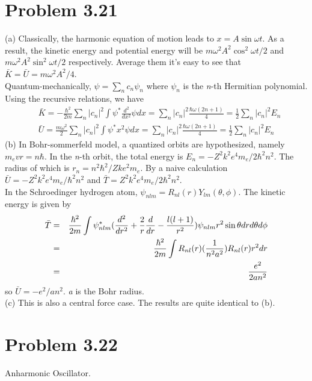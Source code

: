 \documentclass{article}
\begin{document}
\section*{Problem 3.21}
	\noindent (a) Classically, the harmonic equation of motion leads to $x = A \sin \omega t$. As a result, the kinetic energy and potential energy will be $m \omega^{2} A^{2} \cos^{2} \omega t /2$ and $m \omega^{2} A^{2} \sin^{2} \omega t /2$ respectively. Average them it's easy to see that $\bar{K} = \bar{U} =m \omega^{2} A^{2}/4$.\\
	Quantum-mechanically, $\psi = \sum_{n} c_{n} \psi_{n}$ where $\psi_{n}$ is the \emph{n}-th Hermitian polynomial. Using the recursive relations, we have
	\begin{align}
	&\bar{K} = -\frac{\hbar^{2}}{2m} \sum_{n} |c_{n}|^{2} \int \psi^{*} \frac{d^{2}}{dx^{2}} \psi dx = \sum_{n} |c_{n}|^{2} \frac{\hbar \omega (2n+1)}{4} = \frac{1}{2} \sum_{n} |c_{n}|^{2} E_{n}\\
	&\bar{U} = \frac{m \omega^{2}}{2} \sum_{n} |c_{n}|^{2} \int \psi^{*} x^{2} \psi dx= \sum_{n} |c_{n}|^{2} \frac{\hbar \omega (2n+1)}{4} = \frac{1}{2} \sum_{n} |c_{n}|^{2} E_{n}
	\end{align}
	\noindent (b) In Bohr-sommerfeld model, a quantized orbits are hypothesized, namely $m_{e}vr = n \hbar$. In the \emph{n}-th orbit, the total energy is $E_{n} = - Z^{2}k^{2}e^{4}m_{e}/2 \hbar^{2} n^{2}$. The radius of which is $r_{n} = n^{2} \hbar^{2} / Zke^{2}m_{e}$. By a naive calculation $\bar{U} = - Z^{2}k^{2}e^{4}m_{e}/ \hbar^{2} n^{2}$ and $\bar{T} = Z^{2}k^{2}e^{4}m_{e}/2 \hbar^{2} n^{2}$.\\
	In the Schroedinger hydrogen atom, $\psi_{nlm} = R_{nl}(r) Y_{lm}(\theta, \phi)$. The kinetic energy is given by
	\begin{eqnarray}
	\bar{T} &=& \frac{\hbar^{2}}{2m} \int \psi^{*}_{nlm} (\frac{d^{2}}{dr^{2}} + \frac{2}{r} \frac{d}{dr} - \frac{l(l+1)}{r^{2}})\psi_{nlm} r^{2} \sin \theta dr d\theta d\phi \notag \\
	&=& \frac{\hbar^{2}}{2m} \int R_{nl}(r) (\frac{1}{n^{2}a^{2}}) R_{nl}(r) r^{2}dr \notag \\
	&=& \frac{e^{2}}{2a n^{2}}
	\end{eqnarray}
	so $\bar{U} = - e^{2}/a n^{2}$. \emph{a} is the Bohr radius.\\
	\noindent (c) This is also a central force case. The results are quite identical to (b).

\section*{Problem 3.22}
	Anharmonic Oscillator.
\end{document}
